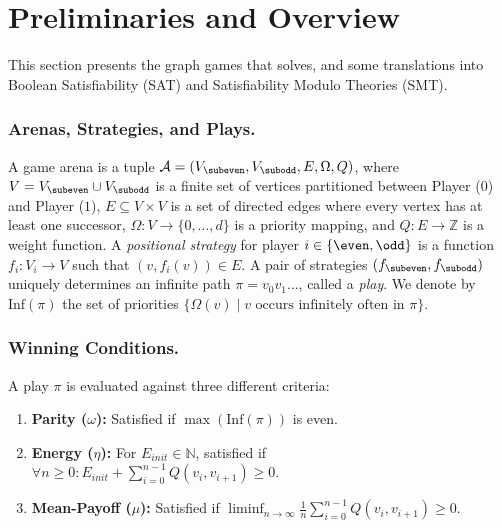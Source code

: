 \documentclass[a4paper,UKenglish,cleveref, autoref, thm-restate, anonymous]{lipics-v2021}
\begin{document}
\section{Preliminaries and Overview}

This section presents the graph games that \nocq solves, and some translations into Boolean Satisfiability (SAT) and Satisfiability Modulo Theories (SMT).

\subsubsection{Arenas, Strategies, and Plays.}

A game arena is a tuple $\mathcal{A} = (V_{\subeven}, V_{\subodd}, E, \Omega, Q)$, where $V = V_{\subeven} \cup V_{\subodd}$ is a finite set of vertices partitioned between Player \even ($0$) and Player \odd ($1$), $E \subseteq V \times V$ is a set of directed edges where every vertex has at least one successor, $\Omega: V \to \{0, \dots, d\}$ is a priority mapping, and $Q: E \to \mathbb{Z}$ is a weight function.
%
A \textit{positional strategy} for player $i \in \{\even, \odd\}$ is a function $f_{i} : V_{i} \to V$ such that $(v, f_i(v)) \in E$. A pair of strategies $(f_{\subeven}, f_{\subodd})$ uniquely determines an infinite path $\pi = v_0 v_1 \dots$, called a \textit{play}. We denote by $\text{Inf}(\pi)$ the set of priorities $\{\Omega(v) \mid v \text{ occurs infinitely often in } \pi\}$.

\subsubsection{Winning Conditions.}
A play $\pi$ is evaluated against three different criteria:
%
\begin{enumerate}
    \item \textbf{Parity ($\omega$):} Satisfied if $\max(\text{Inf}(\pi))$ is even.
    \item \textbf{Energy ($\eta$):} For $E_{init} \in \mathbb{N}$, satisfied if $\forall n \ge 0: E_{init} + \sum_{i=0}^{n-1} Q(v_i, v_{i+1}) \ge 0$.
    \item \textbf{Mean-Payoff ($\mu$):} Satisfied if $\liminf_{n \to \infty} \frac{1}{n} \sum_{i=0}^{n-1} Q(v_i, v_{i+1}) \ge 0$.
\end{enumerate}
\end{document}
